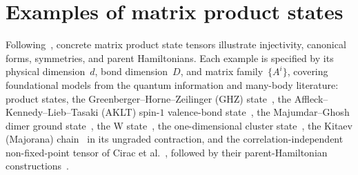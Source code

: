 \chapter{Examples of matrix product states}\label{ch:examples}

Following~\cite[Section~III]{Cirac2021Matrix}, concrete matrix product state
tensors illustrate injectivity, canonical forms, symmetries, and parent
Hamiltonians. Each example is specified by its physical dimension~$d$, bond
dimension~$D$, and matrix family~$\{A^i\}$, covering foundational models from
the quantum information and many-body literature:
product states,
the Greenberger--Horne--Zeilinger (GHZ) state~\cite{GreenbergerHorneZeilinger1989,Greenberger1990Bell},
the Affleck--Kennedy--Lieb--Tasaki (AKLT) spin-$1$ valence-bond state~\cite{AKLT1987Rigorous,AKLT1988ValenceBond},
the Majumdar--Ghosh dimer ground state~\cite{MajumdarGhosh1969,MajumdarGhosh1969II},
the W state~\cite{DurVidalCirac2000},
the one-dimensional cluster state~\cite{BriegelRaussendorf2001,RaussendorfBriegel2001},
the Kitaev (Majorana) chain~\cite{Kitaev2001Majorana} in its ungraded contraction,
and the correlation-independent non-fixed-point tensor of Cirac et al.~\cite{Cirac2017MPDO_AnnPhys},
followed by their parent-Hamiltonian constructions~\cite{Fannes1992Finitely,PerezGarcia2007Matrix}.











